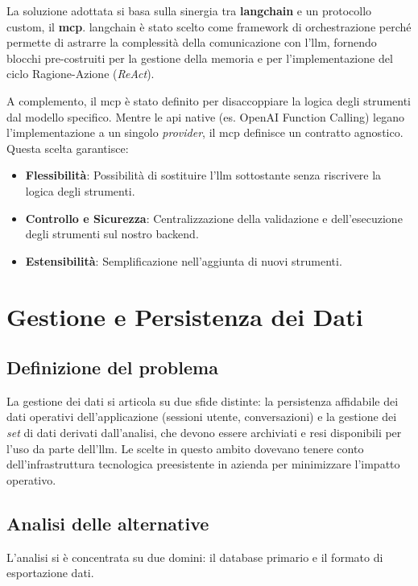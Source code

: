 La soluzione adottata si basa sulla sinergia tra \textbf{\gls{langchain}} e un protocollo custom, il \textbf{\gls{mcp}}.
\gls{langchain} è stato scelto come \gls{framework} di orchestrazione perché permette di astrarre la complessità della comunicazione con l'\gls{llm}, fornendo blocchi pre-costruiti per la gestione della memoria e per l'implementazione del ciclo Ragione-Azione (\textit{ReAct}).

A complemento, il \gls{mcp} è stato definito per disaccoppiare la logica degli strumenti dal modello specifico. Mentre le \gls{api} native (es. OpenAI Function Calling) legano l'implementazione a un singolo \textit{provider}, il \gls{mcp} definisce un contratto agnostico. Questa scelta garantisce:
\begin{itemize}
    \item \textbf{Flessibilità}: Possibilità di sostituire l'\gls{llm} sottostante senza riscrivere la logica degli strumenti.
    \item \textbf{Controllo e Sicurezza}: Centralizzazione della validazione e dell'esecuzione degli strumenti sul nostro \gls{backend}.
    \item \textbf{Estensibilità}: Semplificazione nell'aggiunta di nuovi strumenti.
\end{itemize}

\section{Gestione e Persistenza dei Dati}
\label{sec:data_persistence}

\subsection{Definizione del problema}
La gestione dei dati si articola su due sfide distinte: la persistenza affidabile dei dati operativi dell'applicazione (sessioni utente, conversazioni) e la gestione dei \textit{set} di dati derivati dall'analisi, che devono essere archiviati e resi disponibili per l'uso da parte dell'\gls{llm}. Le scelte in questo ambito dovevano tenere conto dell'infrastruttura tecnologica preesistente in azienda per minimizzare l'impatto operativo.

\subsection{Analisi delle alternative}
L'analisi si è concentrata su due domini: il database primario e il formato di esportazione dati.

